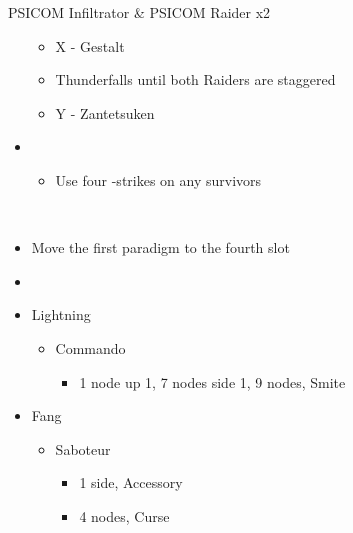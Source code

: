 \begin{paracol}{2}
\begin{battle}{PSICOM Infiltrator \& PSICOM Raider x2}
\begin{itemize}
\begin{itemize}
				      \item X - Gestalt
				      \item Thunderfalls until both Raiders are staggered
				      \item Y - Zantetsuken
			      \end{itemize}
			\item \first
			      \begin{itemize}
				      \item Use four -strikes on any survivors
			      \end{itemize}
		\end{itemize}
		  
	\end{battle}
	\switchcolumn*
	\
	\begin{menu}

		\begin{itemize}
			\paradigm
			\begin{itemize}
				\item Move the first paradigm to the fourth slot
				\item {}%
				      {\paradigmline{(\rav)}{\syn}{\sab}}%
				      {\paradigmline{(\rav)}{\rav}{(\sab)}}%
				      {\paradigmline{(\rav)}{(\rav)}{\sen}}%
				      {\paradigmline[4]{\textit{\rav}}{\textit{\rav}}{\textit{\com}}}%
				      {\paradigmline{[\com]}{\rav}{\com}}%
				      {\paradigmline{[\com]}{\rav}{\com}}
			\end{itemize}
			\crystarium
			\begin{itemize}
				\item Lightning
				      \begin{itemize}
					      \item Commando
					            \begin{itemize}
						            \item 1 node up 1, 7 nodes side 1, 9 nodes, Smite
					            \end{itemize}
				      \end{itemize}
				\item Fang
				      \begin{itemize}
					      \item Saboteur
					            \begin{itemize}
						            \item 1 side, Accessory
						            \item 4 nodes, Curse
					            \end{itemize}
				      \end{itemize}
			\end{itemize}


\end{itemize}
\end{menu}
\end{paracol}

